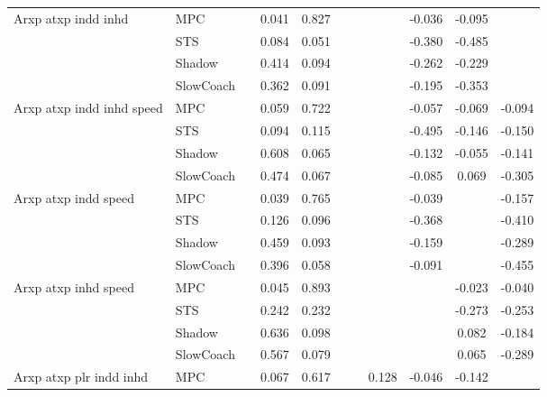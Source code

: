 \begin{tabular}{|l|l|*{9}{c|}}
\midrule
Arxp atxp indd inhd    & MPC &       &     0.041 &     0.827 &     &     &     &  -0.036 &  -0.095 &       \\
                              & STS &       &     0.084 &     0.051 &     &     &     &  -0.380 &  -0.485 &       \\
                              & Shadow &       &     0.414 &     0.094 &     &     &     &  -0.262 &  -0.229 &       \\
                              & SlowCoach &       &     0.362 &     0.091 &     &     &     &  -0.195 &  -0.353 &       \\
\midrule
Arxp atxp indd inhd speed    & MPC &       &     0.059 &     0.722 &     &     &     &  -0.057 &  -0.069 &   -0.094 \\
                              & STS &       &     0.094 &     0.115 &     &     &     &  -0.495 &  -0.146 &   -0.150 \\
                              & Shadow &       &     0.608 &     0.065 &     &     &     &  -0.132 &  -0.055 &   -0.141 \\
                              & SlowCoach &       &     0.474 &     0.067 &     &     &     &  -0.085 &   0.069 &   -0.305 \\
\midrule
Arxp atxp indd speed    & MPC &       &     0.039 &     0.765 &     &     &     &  -0.039 &      &   -0.157 \\
                              & STS &       &     0.126 &     0.096 &     &     &     &  -0.368 &      &   -0.410 \\
                              & Shadow &       &     0.459 &     0.093 &     &     &     &  -0.159 &      &   -0.289 \\
                              & SlowCoach &       &     0.396 &     0.058 &     &     &     &  -0.091 &      &   -0.455 \\
\midrule
Arxp atxp inhd speed    & MPC &       &     0.045 &     0.893 &     &     &     &      &  -0.023 &   -0.040 \\
                              & STS &       &     0.242 &     0.232 &     &     &     &      &  -0.273 &   -0.253 \\
                              & Shadow &       &     0.636 &     0.098 &     &     &     &      &   0.082 &   -0.184 \\
                              & SlowCoach &       &     0.567 &     0.079 &     &     &     &      &   0.065 &   -0.289 \\
\midrule
Arxp atxp plr indd inhd    & MPC &       &     0.067 &     0.617 &     &     &  0.128 &  -0.046 &  -0.142 &       \\

\end{tabular}
